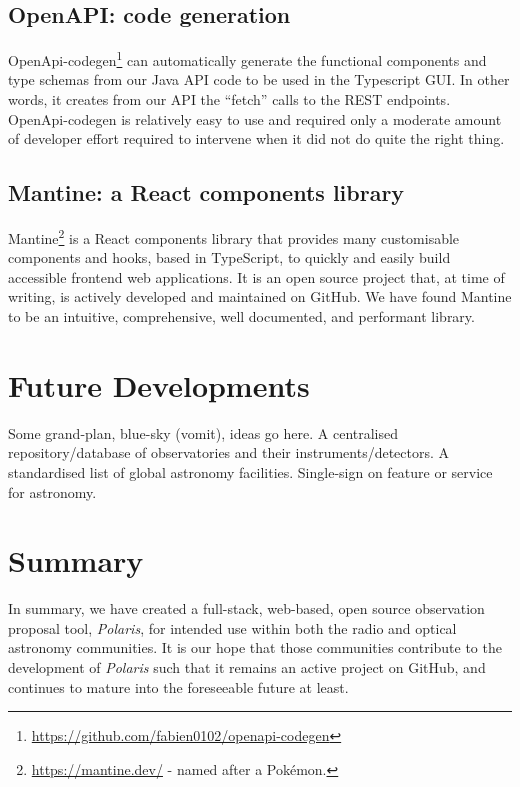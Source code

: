 \documentclass[11pt,twoside]{article}
\begin{document}
\subsection{OpenAPI: code generation}\label{subsec:openapi-code-generation}

OpenApi-codegen\footnote{\url{https://github.com/fabien0102/openapi-codegen}} can automatically generate
the functional components and type schemas from our Java API code to be used in the Typescript GUI\@.
In other words, it creates from our API the ``fetch'' calls to the REST endpoints.
OpenApi-codegen is relatively easy to use and required only a moderate amount of developer effort
required to intervene when it did not do quite the right thing.

\subsection{Mantine: a React components library}\label{subsec:mantine:-a-react-components-library}

Mantine\footnote{\url{https://mantine.dev/} - named after a Pok\'emon.} is a React components library that
provides many customisable components and hooks, based in TypeScript, to quickly and easily build accessible
frontend web applications.
It is an open source project that, at time of writing, is actively developed and maintained on GitHub.
We have found Mantine to be an intuitive, comprehensive, well documented, and performant library.

\section{Future Developments}\label{sec:future-developments}

Some grand-plan, blue-sky (vomit), ideas go here.
A centralised repository/database of observatories and their instruments/detectors.
A standardised list of global astronomy facilities.
Single-sign on feature or service for astronomy.

\section{Summary}\label{sec:summary}
In summary, we have created a full-stack, web-based, open source observation proposal tool, \emph{Polaris},
for intended use within both the radio and optical astronomy communities.
It is our hope that those communities contribute to the development of \emph{Polaris} such that it remains an
active project on GitHub, and continues to mature into the foreseeable future at least.
\end{document}

